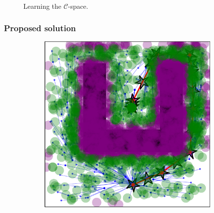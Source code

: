 \documentclass{beamer}
\begin{document}
\begin{frame}
\begin{figure}[!ht]
\begin{subfigure}[b]{0.45\textwidth}
		\end{subfigure}
		\caption{Learning the $\mathcal{C}$-space.}
		\label{fig:LearningConfigSpace}
	  \end{figure}
\end{frame}	


\begin{frame}
	\frametitle{Proposed solution}	
	\begin{figure}[!ht]
		\centering 
		\begin{subfigure}[b]{0.45\textwidth}
			\includegraphics[width=\textwidth]{figChap4/RRTstar2DML_learning237.2.pdf}
			 

\end{subfigure}
\end{figure}
\end{frame}
\end{document}
